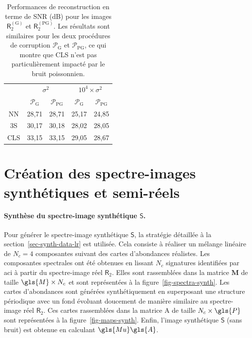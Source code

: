 \begin{table}[t]
    \centering
    \begin{tabular}{ccc|cc}
        \toprule
        & \multicolumn{2}{c|}{$\sigma^2$} & \multicolumn{2}{c}{$10^4\times\sigma^2$}\\
        & $\mathcal{P}_{\mathrm{G}}$ & $\mathcal{P}_{\mathrm{PG}}$ & $\mathcal{P}_{\mathrm{G}}$ & $\mathcal{P}_{\mathrm{PG}}$\\
        \midrule
        NN     & 28,71    & 28,71              & 25,17    & 24,85 \\
        3S     & 30,17    & 30,18              & 28,02    & 28,05 \\
        CLS    & 33,15    & 33,15              & 29,05    & 28,67 \\
        \bottomrule
    \end{tabular}
    \caption{Performances de reconstruction en terme de SNR (dB) pour les images $\mathsf{R}_2^{(\mathrm{G})}$ et $\mathsf{R}_2^{(\mathrm{PG})}$. Les résultats sont similaires pour les deux procédures de corruption $\mathcal{P}_{\mathrm{G}}$ et $\mathcal{P}_{\mathrm{PG}}$, ce qui montre que CLS n'est pas particulièrement impacté par le bruit poissonnien.
        \protect\label{table:SNR-poisson-gaussian}}
\end{table}


\section{Création des spectre-images synthétiques et semi-réels}\label{sec-spim-creation-hr}

\paragraph{Synthèse du spectre-image synthétique $\mathsf{S}$.} Pour générer le spectre-image synthétique $\mathsf{S}$, la stratégie détaillée à la section~\ref{sec-synth-data-lr} est utilisée. Cela consiste à réaliser un mélange linéaire de $N_c=4$ composantes suivant des cartes d'abondances réalistes. Les composantes spectrales ont été obtenues en lissant $N_c$ signatures identifiées par \gls{aci} à partir du spectre-image réel $\mathsf{R}_2$. Elles sont rassemblées dans la matrice $\mathbf{M}$ de taille $\gls{M}\times N_c$ et sont représentées à la figure~\ref{fig-spectra-synth}. Les cartes d'abondances sont générées synthétiquement en superposant une structure périodique avec un fond évoluant doucement de manière similaire au spectre-image réel $\mathsf{R}_2$. Ces cartes rassemblées dans la matrice \gls{A} de taille $N_c\times\gls{P}$ sont représentées à la figure~\ref{fig-maps-synth}. Enfin, l'image synthétique $\mathsf{S}$ (sans bruit) est obtenue en calculant $\gls{Mu}\gls{A}$.

